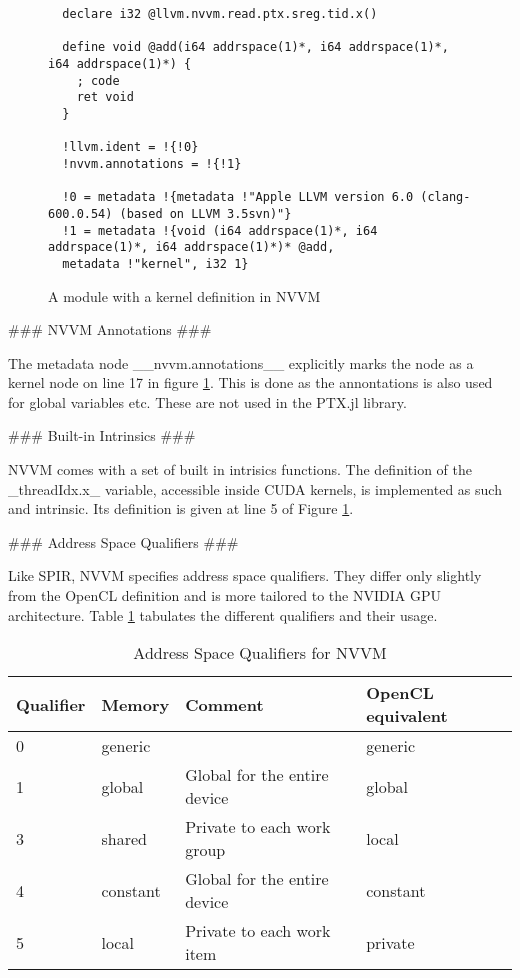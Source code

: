 \begin{markdown}
\begin{figure}[H]
\begin{verbatim}
  declare i32 @llvm.nvvm.read.ptx.sreg.tid.x()
  
  define void @add(i64 addrspace(1)*, i64 addrspace(1)*, i64 addrspace(1)*) {
    ; code
    ret void
  }
  
  !llvm.ident = !{!0}
  !nvvm.annotations = !{!1}
  
  !0 = metadata !{metadata !"Apple LLVM version 6.0 (clang-600.0.54) (based on LLVM 3.5svn)"}
  !1 = metadata !{void (i64 addrspace(1)*, i64 addrspace(1)*, i64 addrspace(1)*)* @add,
  metadata !"kernel", i32 1}
  \end{verbatim}
  \caption{A module with a kernel definition in NVVM}
  \label{fig:nvvm}
\end{figure}

### NVVM Annotations ###

The metadata node __nvvm.annotations__ explicitly marks the node as a
kernel node on line 17 in figure \ref{fig:nvvm}. This is done as the
annontations is also used for global variables etc. These are not used
in the PTX.jl library.

### Built-in Intrinsics ###

\gls{NVVM} comes with a set of built in intrisics functions. The
definition of the _threadIdx.x_ variable, accessible inside \gls{CUDA}
kernels, is implemented as such and intrinsic. Its definition is given
at line 5 of Figure \ref{fig:nvvm}.

### Address Space Qualifiers ###

Like \gls{SPIR}, \gls{NVVM} specifies address space qualifiers. They
differ only slightly from the OpenCL definition and is more tailored
to the NVIDIA GPU architecture. Table \ref{tab:nvvm:addr} tabulates
the different qualifiers and their usage.

\begin{table}[H]
  \centering
  \begin{tabular}{|l|l|l|l|}
    \hline
    Qualifier & Memory   & Comment                      & OpenCL equivalent \\
    \hline
0         & generic  &                   & generic  \\
1         & global   & Global for the entire device & global \\
3         & shared   & Private to each work group   & local \\
4         & constant & Global for the entire device & constant \\
5         & local    & Private to each work item    & private \\
    \hline
  \end{tabular}
  \caption{Address Space Qualifiers for NVVM}
  \label{tab:nvvm:addr}
\end{table}



\end{markdown}
